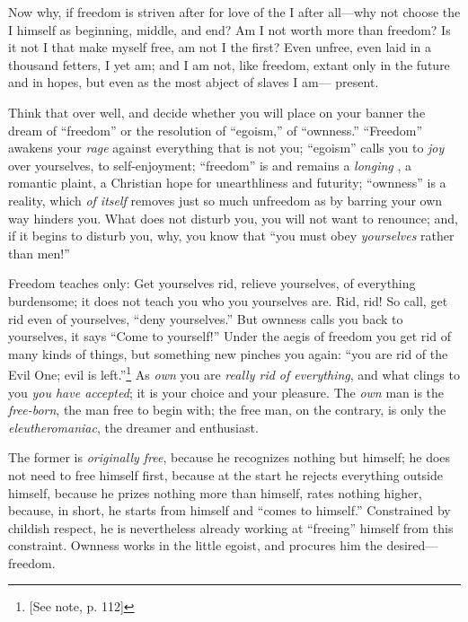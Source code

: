 Now why, if freedom is striven after for love of the I after all---why not 
choose the I himself as beginning, middle, and end? Am I not worth more than 
freedom? Is it not I that make myself free, am not I the first? Even unfree, 
even laid in a thousand fetters, I yet am; and I am not, like freedom, extant 
only in the future and in hopes, but even as the most abject of slaves I am--- 
present.

Think that over well, and decide whether you will place on your banner the 
dream of ``freedom'' or the resolution of ``egoism,'' of ``ownness.'' 
``Freedom'' awakens your \textit{rage} against everything that is not you; 
``egoism'' calls you to \textit{joy} over yourselves, to self-enjoyment; 
``freedom'' is and remains a \textit{longing} , a romantic plaint, a 
Christian hope for unearthliness and futurity; ``ownness'' is a reality, 
which \textit{of itself} removes just so much unfreedom as by barring your own 
way hinders you. What does not disturb you, you will not want to renounce; 
and, if it begins to disturb you, why, you know that ``you must obey 
\textit{yourselves} rather than men!''

Freedom teaches only: Get yourselves rid, relieve yourselves, of everything 
burdensome; it does not teach you who you yourselves are. Rid, rid! So call, 
get rid even of yourselves, ``deny yourselves.'' But ownness calls you back 
to yourselves, it says ``Come to yourself!'' Under the aegis of freedom you 
get rid of many kinds of things, but something new pinches you again: ``you 
are rid of the Evil One; evil is left.''\footnote{[See note, p. 112]} As 
\textit{own} you are \textit{really rid of everything}, and what clings to you 
\textit{you have accepted}; it is your choice and your pleasure. The 
\textit{own} man is the \textit{free-born}, the man free to begin with; the 
free man, on the contrary, is only the \textit{eleutheromaniac}, the dreamer 
and enthusiast.

The former is \textit{originally free}, because he recognizes nothing but 
himself; he does not need to free himself first, because at the start he 
rejects everything outside himself, because he prizes nothing more than 
himself, rates nothing higher, because, in short, he starts from himself and 
``comes to himself.'' Constrained by childish respect, he is nevertheless 
already working at ``freeing'' himself from this constraint. Ownness works 
in the little egoist, and procures him the desired---freedom.

